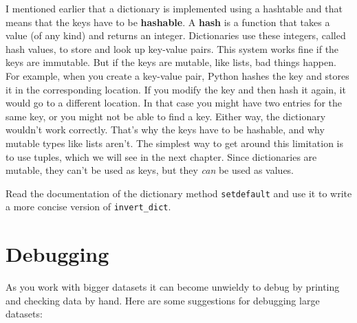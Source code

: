 \beforeverb
{}
\afterverb
%
I mentioned earlier that a dictionary is implemented using
a hashtable and that means that the keys have to be {\bf hashable}.
%
%
A {\bf hash} is a function that takes a value (of any kind)
and returns an integer.  Dictionaries use these integers,
called hash values, to store and look up key-value pairs.
%
%
This system works fine if the keys are immutable.  But if the
keys are mutable, like lists, bad things happen.  For example,
when you create a key-value pair, Python hashes the key and 
stores it in the corresponding location.  If you modify the
key and then hash it again, it would go to a different location.
In that case you might have two entries for the same key,
or you might not be able to find a key.  Either way, the
dictionary wouldn't work correctly.
%
That's why the keys have to be hashable, and why mutable types like
lists aren't.  {\color{red} The simplest way to get around this limitation is to
use tuples, which we will see in the next chapter.}
%
Since dictionaries are mutable, they can't be used as keys,
but they {\em can} be used as values.

\begin{exercise}
Read the documentation of the dictionary method {\tt setdefault}
and use it to write a more concise version of \verb"invert_dict".


\end{exercise}


\section{Debugging}

As you work with bigger datasets it can become unwieldy to
debug by printing and checking data by hand.  Here are some
suggestions for debugging large datasets:

